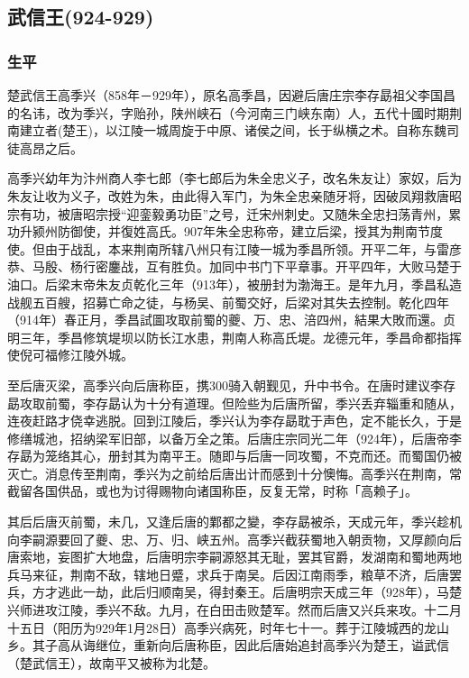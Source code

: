 
\subsection{武信王\tiny(924-929)}

\subsubsection{生平}

楚武信王高季兴（858年－929年），原名高季昌，因避后唐庄宗李存勗祖父李国昌的名讳，改为季兴，字贻孙，陕州峡石（今河南三门峡东南）人，五代十國时期荆南建立者(楚王)，以江陵一城周旋于中原、诸侯之间，长于纵横之术。自称东魏司徒高昂之后。

高季兴幼年为汴州商人李七郎（李七郎后为朱全忠义子，改名朱友让）家奴，后为朱友让收为义子，改姓为朱，由此得入军门，为朱全忠亲随牙将，因破凤翔救唐昭宗有功，被唐昭宗授“迎銮毅勇功臣”之号，迁宋州刺史。又随朱全忠扫荡青州，累功升颍州防御使，并復姓高氏。907年朱全忠称帝，建立后梁，授其为荆南节度使。但由于战乱，本来荆南所辖八州只有江陵一城为季昌所领。开平二年，与雷彦恭、马殷、杨行密鏖战，互有胜负。加同中书门下平章事。开平四年，大败马楚于油口。后梁末帝朱友贞乾化三年（913年），被册封为渤海王。是年九月，季昌私造战舰五百艘，招募亡命之徒，与杨吴、前蜀交好，后梁对其失去控制。乾化四年（914年）春正月，季昌試圖攻取前蜀的夔、万、忠、涪四州，結果大敗而還。贞明三年，季昌修筑堤坝以防长江水患，荆南人称高氏堤。龙德元年，季昌命都指挥使倪可福修江陵外城。

至后唐灭梁，高季兴向后唐称臣，携300骑入朝觐见，升中书令。在唐时建议李存勗攻取前蜀，李存勗认为十分有道理。但险些为后唐所留，季兴丢弃辎重和随从，连夜赶路才侥幸逃脱。回到江陵后，季兴认为李存勗耽于声色，定不能长久，于是修缮城池，招纳梁军旧部，以备万全之策。后唐庄宗同光二年（924年），后唐帝李存勗为笼络其心，册封其为南平王。随即与后唐一同攻蜀，不克而还。而蜀国仍被灭亡。消息传至荆南，季兴为之前给后唐出计而感到十分懊悔。高季兴在荆南，常截留各国供品，或也为讨得赐物向诸国称臣，反复无常，时称「高赖子」。

其后后唐灭前蜀，未几，又逢后唐的鄴都之變，李存勗被杀，天成元年，季兴趁机向李嗣源要回了夔、忠、万、归、峡五州。高季兴截获蜀地入朝贡物，又厚颜向后唐索地，妄图扩大地盘，后唐明宗李嗣源怒其无耻，罢其官爵，发湖南和蜀地两地兵马来征，荆南不敌，辖地日蹙，求兵于南吴。后因江南雨季，粮草不济，后唐罢兵，方才逃此一劫，此后归顺南吴，得封秦王。后唐明宗天成三年（928年），马楚兴师进攻江陵，季兴不敌。九月，在白田击败楚军。然而后唐又兴兵来攻。十二月十五日（阳历为929年1月28日）高季兴病死，时年七十一。葬于江陵城西的龙山乡。其子高从诲继位，重新向后唐称臣，因此后唐始追封高季兴为楚王，谥武信（楚武信王），故南平又被称为北楚。


